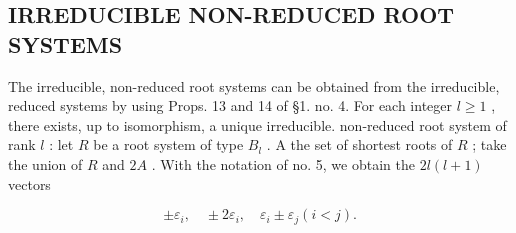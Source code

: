 \subsection{IRREDUCIBLE NON-REDUCED ROOT SYSTEMS}

The irreducible, non-reduced root systems can be obtained from the irreducible, reduced systems by using Props. 13 and 14 of §1. no. 4. For each integer \(l \geqslant 1\) , there exists, up to isomorphism, a unique irreducible. non-reduced root system of rank \(l\) : let \(R\) be a root system of type \(B_l\) . A the set of shortest roots of \(R\) ; take the union of \(R\) and \(2A\) . With the notation of no. 5, we obtain the \(2l(l + 1)\) vectors

\[
\pm \varepsilon_ {i}, \quad \pm 2 \varepsilon_ {i}, \quad \varepsilon_ {i} \pm \varepsilon_ {j} (i <   j).
\]

